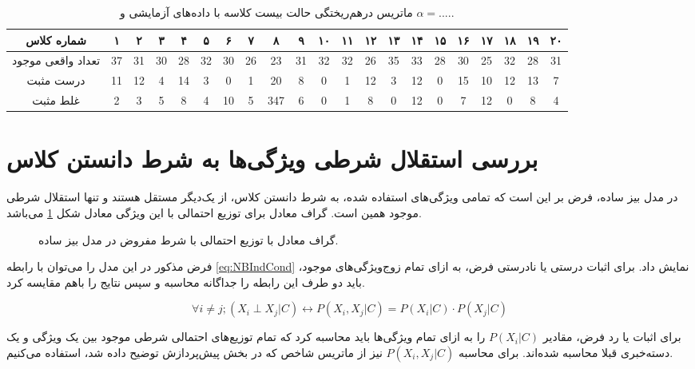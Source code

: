 \documentclass[11.5pt,a4paper]{article}
\begin{document}
\begin{table}[h]
\center
\caption{ماتریس درهم‌ریختگی حالت بیست کلاسه با داده‌های آزمایشی و $\alpha = .....$}
\label{tbl:20ccm2000ts}
\begin{tabular}{c | c | c | c | c | c | c | c | c | c | c | c | c | c | c | c | c | c | c | c | c }
  شماره کلاس & ۱ & ۲ & ۳ & ۴ & ۵ & ۶ & ۷ & ۸ & ۹ & ۱۰ & ۱۱ & ۱۲ & ۱۳ & ۱۴ & ۱۵ & ۱۶ & ۱۷ & ۱۸ & ۱۹ & ۲۰ \\
\hline
\hline
تعداد واقعی موجود& 37  &  31  &  30  &  28  &  32  &  30  &  26  &  23  &  31  &  32  & 32   &  26  &  35  &  33  &  28  &  30  &  25  &  32  &  28  &   31 \\
درست مثبت& 11  &  12  &  4  &  14  &  3  &  0  &  1  &  20  &  8  &  0  &  1  &  12  & 3   &  12  &  0  &  15  &  10  &   12 &  13  &  7  \\
غلط مثبت&  2 &  3  & 5   &  8  &  4  &  10  &  5  &  347  &  6  & 0   &  1  &  8  & 0   &   12 &  0  &  7  &  12  &  0  &  8  &  4  \\

\end{tabular}
\end{table}

\section{بررسی استقلال شرطی ویژگی‌ها به شرط دانستن کلاس}

در مدل بیز ساده، فرض بر این است که تمامی ویژگی‌های استفاده شده، به شرط دانستن کلاس، از یک‌دیگر مستقل هستند و تنها استقلال شرطی موجود همین است. گراف معادل برای توزیع احتمالی با این ویژگی معادل شکل
\ref{fig:NBGraph}
می‌باشد.

\begin{figure}[h]
\center
\caption{گراف معادل با توزیع احتمالی با شرط مفروض در مدل بیز ساده.}
\label{fig:NBGraph}
\end{figure}

فرض مذکور در این مدل را می‌توان با رابطه 
\ref{eq:NBIndCond}
نمایش داد. برای اثبات درستی یا نادرستی فرض،‌ به ازای تمام زوج‌ویژگی‌های موجود، باید دو طرف این رابطه را جداگانه محاسبه و سپس نتایج را باهم مقایسه کرد.


\begin{equation}
\label{eq:NBIndCond}
\forall i \neq j;  (X_i \perp X_j|C) \longleftrightarrow P(X_i,X_j| C) = P(X_i|C)\cdot P(X_j|C)  
\end{equation}

برای اثبات یا رد فرض، مقادیر $P(X_i|C)$ را به ازای تمام ویژگی‌ها باید محاسبه کرد که تمام توزیع‌های احتمالی شرطی  موجود بین یک ویژگی و یک دسته‌خبری قبلا محاسبه شده‌اند. برای محاسبه $P(X_i,X_j|C)$ نیز از ماتریس شاخص که در بخش پیش‌پردازش توضیح داده شد، استفاده می‌کنیم.
\end{document}

